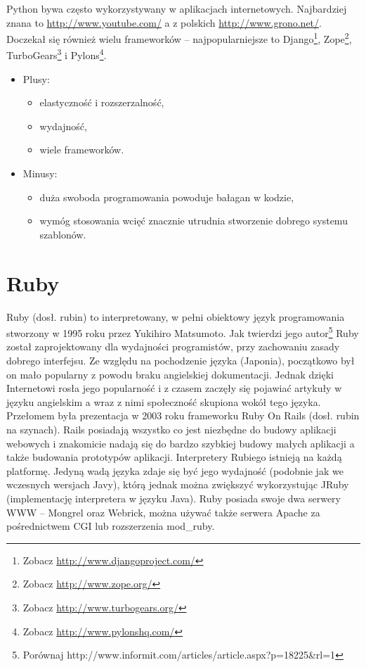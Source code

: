 \documentclass[a4paper,12pt,oneside]{report}
\begin{document}
Python bywa często wykorzystywany w aplikacjach internetowych. Najbardziej znana to \url{http://www.youtube.com/} a z polskich \url{http://www.grono.net/}. Doczekał się również wielu frameworków -- najpopularniejsze to Django\footnote{Zobacz \url{http://www.djangoproject.com/}}, Zope\footnote{Zobacz \url{http://www.zope.org/}}, TurboGears\footnote{Zobacz \url{http://www.turbogears.org/}} i Pylons\footnote{Zobacz \url{http://www.pylonshq.com/}}.

\begin{itemize}
  \item Plusy:
  \begin{itemize}
    \item elastyczność i rozszerzalność,
    \item wydajność,
    \item wiele frameworków.
  \end{itemize}
  \item Minusy:
  \begin{itemize}
    \item duża swoboda programowania powoduje bałagan w kodzie,
    \item wymóg stosowania wcięć znacznie utrudnia stworzenie dobrego systemu szablonów.
  \end{itemize}
\end{itemize}

\section{Ruby}
\label{sec:ror}
Ruby (dosł. rubin) to interpretowany, w pełni obiektowy język programowania stworzony w 1995 roku przez Yukihiro Matsumoto. Jak twierdzi jego autor\footnote{Porównaj http://www.informit.com/articles/article.aspx?p=18225\&rl=1} Ruby został zaprojektowany dla wydajności programistów, przy zachowaniu zasady dobrego interfejsu. Ze względu na pochodzenie języka (Japonia), początkowo był on mało popularny z powodu braku angielskiej dokumentacji. Jednak dzięki Internetowi rosła jego popularność i z czasem zaczęły się pojawiać artykuły w języku angielskim a wraz z nimi społeczność skupiona wokół tego języka. Przełomem była prezentacja w 2003 roku frameworku Ruby On Rails (dosł. rubin na szynach). Rails posiadają wszystko co jest niezbędne do budowy aplikacji webowych i znakomicie nadają się do bardzo szybkiej budowy małych aplikacji a także budowania prototypów aplikacji. Interpretery Rubiego istnieją na każdą platformę. Jedyną wadą języka zdaje się być jego wydajność (podobnie jak we wczesnych wersjach Javy), którą jednak można zwiększyć wykorzystując JRuby (implementację interpretera w języku Java). Ruby posiada swoje dwa serwery WWW -- Mongrel oraz Webrick, można używać także serwera Apache za pośrednictwem CGI lub rozszerzenia mod\_ruby.
\end{document}
